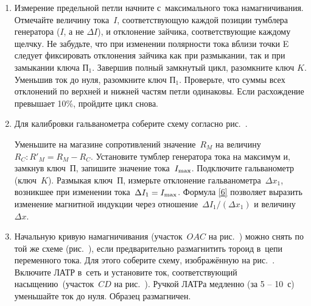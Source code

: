 \begin{lab:task}
\begin{enumerate}
	Аккуратно обойдите всю петлю, чтобы убедиться, что зайчик нигде не выходит
за пределы шкалы. Как правило, самые большие
	скачки~$\Delta x$ происходят на участках~$EF$ и $E'F'$.

	Если зайчик вышел за пределы шкалы~--- разомкните ключ~$K_2$ и, увеличив
сопротивление~$R_M$, начните обход петли
	сначала.

	Если зашкаливания не произошло и максимальное отклонение зайчика близко к
концу шкалы~--- приступайте к измерениям.


	\item Измерение предельной петли начните с~максимального тока
намагничивания. Отмечайте величину тока~$I$, соответствующую
	каждой позиции тумблера генератора ($I$, а не $\Delta I$), и отклонение
зайчика, соответствующие каждому щелчку.
	Не забудьте, что при изменении полярности тока вблизи точки E следует
фиксировать отклонения зайчика как при размыкании, так и при замыкании ключа
$\text{П}_1$.
	Завершив полный  замкнутый цикл,  разомкните ключ $K$. Уменьшив ток до нуля,
разомкните ключ $\text{П}_1$.
	Проверьте, что суммы всех отклонений по верхней и нижней частям петли
одинаковы. Если расхождение превышает 10\%, пройдите цикл снова.


	\item Для калибровки гальванометра соберите схему согласно
рис.~.

	Уменьшите на магазине сопротивлений значение~$R_M$ на
	величину~$R_C: R'_M=R_M-R_C$. Установите тумблер генератора тока на максимум
и, замкнув ключ~$\text{П}$, запишите значение
	тока~$I_{\rm max}$. Подключите гальванометр (ключ~$K$). Размыкая
ключ~$\text{П}$, измерьте отклонение гальванометра~$\Delta x_1$,
	возникшее при изменении тока~$\Delta I_1=I_{\rm max}$. Формула \eqref{6}
позволяет выразить изменение магнитной индукции через
	отношение~$\Delta I_1/(\Delta x_1)$ и величину~$\Delta x$.


	\item Начальную кривую намагничивания (участок~$OAC$ на
рис.~) можно снять по той же схеме
(рис.~), если предварительно
	размагнитить тороид в~цепи переменного тока. Для этого соберите схему,
изображённую на рис.~. Включите ЛАТР в~сеть и
	установите ток, соответствующий насыщению~(участок~$CD$ на
рис.~). Ручкой ЛАТРа медленно (за 5 -- 10~с)
уменьшайте ток до
	нуля. Образец размагничен.


\end{enumerate}
\end{lab:task}
